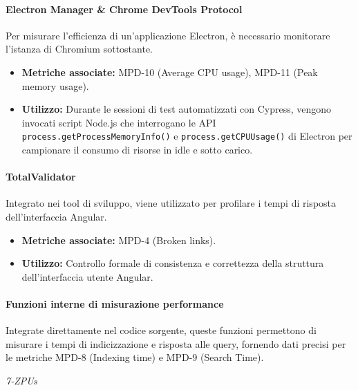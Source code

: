 \documentclass[a4paper,12pt]{article}
\begin{document}
\paragraph{Electron Manager \& Chrome DevTools Protocol}
Per misurare l'efficienza di un'applicazione Electron, è necessario monitorare
l'istanza di Chromium sottostante.
\begin{itemize}
    \item \textbf{Metriche associate:} MPD-10 (Average CPU usage), MPD-11 (Peak memory usage).
    \item \textbf{Utilizzo:} Durante le sessioni di test automatizzati con Cypress, vengono invocati script Node.js che interrogano le API \texttt{process.getProcessMemoryInfo()} e \texttt{process.getCPUUsage()} di Electron per campionare il consumo di risorse in idle e sotto carico.
\end{itemize}

\paragraph{TotalValidator}
Integrato nei tool di sviluppo, viene utilizzato per profilare i tempi di
risposta dell'interfaccia Angular.
\begin{itemize}
    \item \textbf{Metriche associate:} MPD-4 (Broken links).
    \item \textbf{Utilizzo:} Controllo formale di consistenza e correttezza della struttura dell'interfaccia utente Angular.
\end{itemize}

\paragraph{Funzioni interne di misurazione performance}
Integrate direttamente nel codice sorgente, queste funzioni permettono di
misurare i tempi di indicizzazione e risposta alle query, fornendo dati precisi
per le metriche MPD-8 (Indexing time) e MPD-9 (Search Time).

\vfill
\begin{flushright}
    \textit{7-ZPUs}
\end{flushright}
\end{document}
